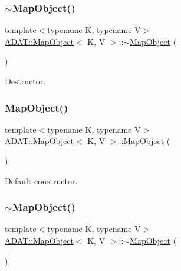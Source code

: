 \subsubsection{\texorpdfstring{$\sim$MapObject()}{~MapObject()}\hspace{0.1cm}{\footnotesize\ttfamily [1/3]}}
{\footnotesize\ttfamily template$<$typename K, typename V$>$ \\
\mbox{\hyperlink{classADAT_1_1MapObject}{A\+D\+A\+T\+::\+Map\+Object}}$<$ K, V $>$\+::$\sim$\mbox{\hyperlink{classADAT_1_1MapObject}{Map\+Object}} (\begin{DoxyParamCaption}{ }\end{DoxyParamCaption})\hspace{0.3cm}{\ttfamily [inline]}}



Destructor. 

\mbox{\label{classADAT_1_1MapObject_a27943eb119ceceef215cf8d638da096e}} 
\subsubsection{\texorpdfstring{MapObject()}{MapObject()}\hspace{0.1cm}{\footnotesize\ttfamily [2/3]}}
{\footnotesize\ttfamily template$<$typename K, typename V$>$ \\
\mbox{\hyperlink{classADAT_1_1MapObject}{A\+D\+A\+T\+::\+Map\+Object}}$<$ K, V $>$\+::\mbox{\hyperlink{classADAT_1_1MapObject}{Map\+Object}} (\begin{DoxyParamCaption}{ }\end{DoxyParamCaption})\hspace{0.3cm}{\ttfamily [inline]}}



Default constructor. 

\mbox{\label{classADAT_1_1MapObject_a11fc724ec76293a4ae1ae98aa5032dfd}} 
\subsubsection{\texorpdfstring{$\sim$MapObject()}{~MapObject()}\hspace{0.1cm}{\footnotesize\ttfamily [2/3]}}
{\footnotesize\ttfamily template$<$typename K, typename V$>$ \\
\mbox{\hyperlink{classADAT_1_1MapObject}{A\+D\+A\+T\+::\+Map\+Object}}$<$ K, V $>$\+::$\sim$\mbox{\hyperlink{classADAT_1_1MapObject}{Map\+Object}} (\begin{DoxyParamCaption}{ }\end{DoxyParamCaption})\hspace{0.3cm}{\ttfamily [inline]}}



